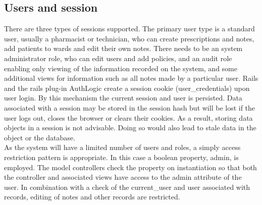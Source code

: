 \documentclass[letterpaper]{amsart}
\begin{document}
\subsection{Users and session} 
There are three types of sessions supported.  The primary user type is a standard user, usually a pharmacist or technician, who can create prescriptions and notes, add patients to wards and edit their own notes.  There needs to be an system administrator role, who can edit users and add policies, and an audit role enabling only viewing of the information recorded on the system, and some additional views for information such as all notes made by a particular user.
Rails and the rails plug-in AuthLogic create a session cookie (user\_credentials) upon user login.  By this mechanism the current session and user is persisted.  Data associated with a session may be stored in the session hash but will be lost if the user logs out, closes the browser or clears their cookies.  As a result, storing data objects in a session is not advisable.  Doing so would also lead to stale data in the object or the database.\\
As the system will have a limited number of users and roles, a simply access restriction pattern is appropriate.  In this case a boolean property, admin, is employed.  The model controllers check the property on instantiation so that both the controller and associated views have access to the admin attribute of the user.  In combination with a check of the current\_user and user associated with records, editing of notes and other records are restricted.
\end{document}
